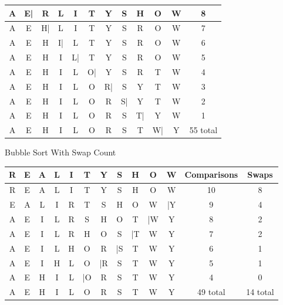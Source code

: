 \documentclass[12pt,largemargins]{homework}
\begin{document}
\begin{alphaparts}
\begin{center}
\begin{tabular}{c c c c c c c c c c c c}
		\hline
		A & E| & R & L & I & T & Y & S & H & O & W & 8\\
		\hline
		A & E & H| & L & I & T & Y & S & R & O & W & 7 \\
		\hline
		A & E & H & I| & L & T & Y & S & R & O & W & 6\\
		\hline
		A & E & H & I & L| & T & Y & S & R & O & W & 5\\
		\hline
		A & E & H & I & L & O| & Y & S & R & T & W & 4\\
		\hline
		A & E & H & I & L & O & R| & S & Y & T & W & 3\\
		\hline
		A & E & H & I & L & O & R & S| & Y & T & W & 2\\
		\hline
		A & E & H & I & L & O & R & S & T| & Y & W & 1\\
		\hline
		A & E & H & I & L & O & R & S & T & W| & Y & 55 total\\
		\end{tabular}
	\end{center}
	\item
	Bubble Sort With Swap Count
		\begin{center}
		\begin{tabular}{c c c c c c c c c c c c c }
		R & E & A & L & I & T & Y & S & H & O & W & Comparisons & Swaps\\
		\hline
		R & E & A & L & I & T & Y & S & H & O & W & 10 & 8\\
		\hline
		E & A & L & I & R & T & S & H & O & W & |Y & 9 &4\\
		\hline
		A & E & I & L & R & S & H & O & T & |W & Y & 8 & 2\\
		\hline
		A & E  & I & L & R & H & O & S & |T & W & Y & 7 & 2\\
		\hline
		A & E & I & L & H & O & R & |S & T & W & Y & 6 & 1\\
		\hline
		A & E & I & H & L & O & |R & S & T & W & Y & 5 & 1\\
		\hline
		A & E & H & I & L & |O & R & S & T & W & Y & 4 & 0\\
		\hline
		A & E & H & I & L & O & R & S & T & W & Y & 49 total & 14 total \\
		\end{tabular}
	\end{center}
	\newpage


\end{alphaparts}
\end{document}

